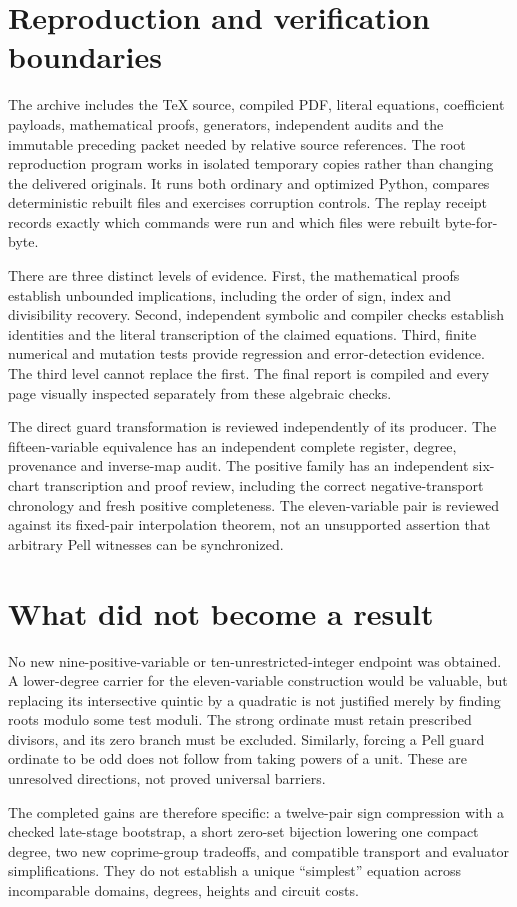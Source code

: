 \section{Reproduction and verification boundaries}
The archive includes the TeX source, compiled PDF, literal equations,
coefficient payloads, mathematical proofs, generators, independent audits
and the immutable preceding packet needed by relative source references.
The root reproduction program works in isolated temporary copies rather
than changing the delivered originals. It runs both ordinary and optimized
Python, compares deterministic rebuilt files and exercises corruption
controls. The replay receipt records exactly which commands were run and
which files were rebuilt byte-for-byte.

There are three distinct levels of evidence. First, the mathematical
proofs establish unbounded implications, including the order of sign,
index and divisibility recovery. Second, independent symbolic and compiler
checks establish identities and the literal transcription of the claimed
equations. Third, finite numerical and mutation tests provide regression
and error-detection evidence. The third level cannot replace the first.
The final report is compiled and every page visually inspected separately
from these algebraic checks.

The direct guard transformation is reviewed independently of its producer.
The fifteen-variable equivalence has an independent complete register,
degree, provenance and inverse-map audit. The positive family has an
independent six-chart transcription and proof review, including the
correct negative-transport chronology and fresh positive completeness.
The eleven-variable pair is reviewed against its fixed-pair interpolation
theorem, not an unsupported assertion that arbitrary Pell witnesses can
be synchronized.

\section{What did not become a result}
No new nine-positive-variable or ten-unrestricted-integer endpoint was
obtained. A lower-degree carrier for the eleven-variable construction
would be valuable, but replacing its intersective quintic by a quadratic
is not justified merely by finding roots modulo some test moduli. The
strong ordinate must retain prescribed divisors, and its zero branch
must be excluded. Similarly, forcing a Pell guard ordinate to be odd
does not follow from taking powers of a unit. These are unresolved
directions, not proved universal barriers.

The completed gains are therefore specific: a twelve-pair sign
compression with a checked late-stage bootstrap, a short zero-set bijection lowering
one compact degree, two new coprime-group tradeoffs, and compatible
transport and evaluator simplifications. They do not establish a unique
``simplest'' equation across incomparable domains, degrees, heights and
circuit costs.
